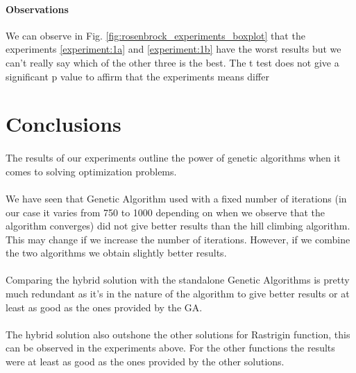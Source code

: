 \documentclass{article}
\begin{document}
\paragraph{Observations} We can observe in Fig. \ref{fig:rosenbrock_experiments_boxplot} that the experiments \ref{experiment:1a} and \ref{experiment:1b} have the worst results but we can't really say which of the other three is the best. The t test does not give a significant p value to affirm that the experiments means differ

\section{Conclusions}
\paragraph{} The results of our experiments outline the power of genetic algorithms when it comes to solving optimization problems.
\paragraph{} We have seen that Genetic Algorithm used with a fixed number of iterations (in our case it varies from 750 to 1000 depending on when we observe that the algorithm converges) did not give better results than the hill climbing algorithm. This may change if we increase the number of iterations. However, if we combine the two algorithms we obtain slightly better results.
\paragraph{} Comparing the hybrid solution with the standalone Genetic Algorithms is pretty much redundant as it's in the nature of the algorithm to give better results or at least as good as the ones provided by the GA.
 
\paragraph{} The hybrid solution also outshone the other solutions for Rastrigin function, this can be observed in the experiments above. For the other functions the results were at least as good as the ones provided by the other solutions. 
\end{document}
